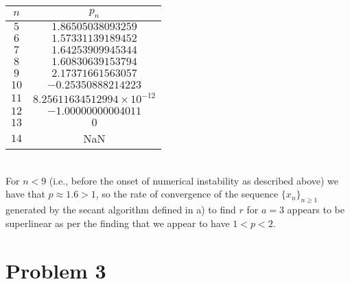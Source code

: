 \documentclass[11pt, letterpaper]{article}
\begin{document}
\begin{table}[h!]
    \begin{center}
        \begin{tabular}{c|c}
            $n$ & $p_n$\\
            \hline
            $5$ & $1.86505038093259$\\
            $6$ & $1.57331139189452$\\
            $7$ & $1.64253909945344$\\
            $8$ & $1.60830639153794$\\
            \hline
            $9$ & $2.17371661563057$\\
            $10$ & $-0.25350888214223$\\
            $11$ & $8.25611634512994\times 10^{-12}$\\
            $12$ & $-1.00000000004011$\\
            $13$ & $0$\\
            $14$ & NaN
        \end{tabular}
    \end{center}
\end{table}\\
For $n<9$ (i.e., before the onset of numerical instability as described above) we have that $p\approx 1.6 > 1$, 
so the rate of convergence of the sequence $\{x_n\}_{n\geq 1}$ generated by the secant algorithm defined in 
a) to find $r$ for $a=3$ appears to be superlinear as per the finding that we appear to have $1<p<2$. 
\section*{Problem 3}
\end{document}

